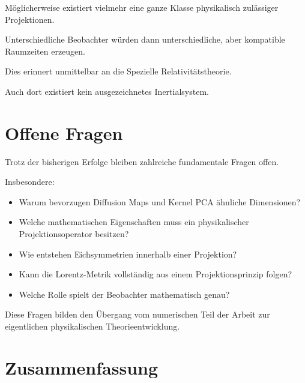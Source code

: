 Möglicherweise existiert vielmehr eine ganze Klasse physikalisch zulässiger Projektionen.

Unterschiedliche Beobachter würden dann unterschiedliche, aber kompatible Raumzeiten erzeugen.

Dies erinnert unmittelbar an die Spezielle Relativitätstheorie.

Auch dort existiert kein ausgezeichnetes Inertialsystem.


\section*{Offene Fragen}

Trotz der bisherigen Erfolge bleiben zahlreiche fundamentale Fragen offen.

Insbesondere:

\begin{itemize}

\item

Warum bevorzugen Diffusion Maps und Kernel PCA ähnliche Dimensionen?

\item

Welche mathematischen Eigenschaften muss ein physikalischer Projektionsoperator besitzen?

\item

Wie entstehen Eichsymmetrien innerhalb einer Projektion?

\item

Kann die Lorentz-Metrik vollständig aus einem Projektionsprinzip folgen?

\item

Welche Rolle spielt der Beobachter mathematisch genau?

\end{itemize}

Diese Fragen bilden den Übergang vom numerischen Teil der Arbeit zur eigentlichen physikalischen Theorieentwicklung.


\section*{Zusammenfassung}

